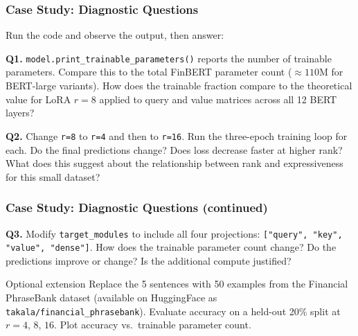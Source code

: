 \documentclass[9pt,t]{beamer}
\begin{document}
\begin{frame}
\frametitle{Case Study: Diagnostic Questions}

Run the code and observe the output, then answer:

\medskip
\textbf{Q1.} \texttt{model.print\_trainable\_parameters()} reports the number of
trainable parameters.  Compare this to the total FinBERT parameter count
($\approx 110$M for BERT-large variants).  How does the trainable fraction
compare to the theoretical value for LoRA $r=8$ applied to query and value
matrices across all 12 BERT layers?

\medskip
\textbf{Q2.} Change \texttt{r=8} to \texttt{r=4} and then to \texttt{r=16}.
Run the three-epoch training loop for each.  Do the final predictions change?
Does loss decrease faster at higher rank?  What does this suggest about the
relationship between rank and expressiveness for this small dataset?

\medskip
\end{frame}

\begin{frame}
\frametitle{Case Study: Diagnostic Questions (continued)}

\textbf{Q3.} Modify \texttt{target\_modules} to include all four projections:
\texttt{["query", "key", "value", "dense"]}.
How does the trainable parameter count change?
Do the predictions improve or change?  Is the additional compute justified?

\medskip
\begin{block}{Optional extension}
  Replace the 5 sentences with 50 examples from the Financial PhraseBank dataset
  (available on HuggingFace as \texttt{takala/financial\_phrasebank}).
  Evaluate accuracy on a held-out 20\% split at $r = 4$, $8$, $16$.
  Plot accuracy vs.\ trainable parameter count.
\end{block}
\end{frame}
\end{document}
